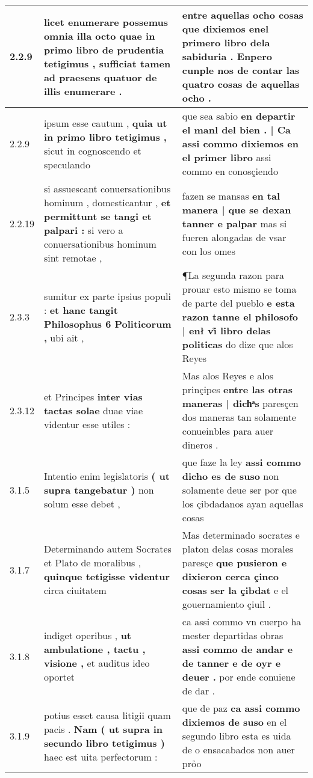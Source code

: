 \begin{tabular}{|p{1cm}|p{6.5cm}|p{6.5cm}|}
2.2.9 & licet enumerare possemus omnia illa octo \textbf{ quae in primo libro de prudentia tetigimus , } sufficiat tamen ad praesens quatuor de illis enumerare . & entre aquellas ocho cosas \textbf{ que dixiemos enel primero libro dela sabiduria . } Enpero cunple nos de contar las quatro cosas de aquellas ocho . \\\hline
2.2.9 & ipsum esse cautum , \textbf{ quia ut in primo libro tetigimus , } sicut in cognoscendo et speculando & que sea sabio \textbf{ en departir el manl del bien . | Ca assi commo dixiemos en el primer libro } assi commo en conosçiendo \\\hline
2.2.19 & si assuescant conuersationibus hominum , domesticantur , \textbf{ et permittunt se tangi et palpari : } si vero a conuersationibus hominum sint remotae , & fazen se mansas \textbf{ en tal manera | que se dexan tanner e palpar } mas si fueren alongadas de vsar con los omes \\\hline
2.3.3 & sumitur ex parte ipsius populi : \textbf{ et hanc tangit Philosophus 6 Politicorum , } ubi ait , & ¶La segunda razon para prouar esto mismo se toma de parte del pueblo \textbf{ e esta razon tanne el philosofo | enł vi̊ libro delas politicas } do dize que alos Reyes \\\hline
2.3.12 & et Principes \textbf{ inter vias tactas solae } duae viae videntur esse utiles : & Mas alos Reyes e alos prinçipes \textbf{ entre las otras maneras | dichͣs } paresçen dos maneras tan solamente conueinbles para auer dineros . \\\hline
3.1.5 & Intentio enim legislatoris \textbf{ ( ut supra tangebatur ) } non solum esse debet , & que faze la ley \textbf{ assi commo dicho es de suso } non solamente deue ser por que los çibdadanos ayan aquellas cosas \\\hline
3.1.7 & Determinando autem Socrates et Plato de moralibus , \textbf{ quinque tetigisse videntur } circa ciuitatem & Mas determinado socrates e platon delas cosas morales paresçe \textbf{ que pusieron e dixieron cerca çinco cosas ser la çibdat } e el gouernamiento çiuil . \\\hline
3.1.8 & indiget operibus , \textbf{ ut ambulatione , tactu , visione , } et auditus ideo oportet & ca assi commo vn cuerpo ha mester departidas obras \textbf{ assi commo de andar e de tanner e de oyr e deuer . } por ende conuiene de dar . \\\hline
3.1.9 & potius esset causa litigii quam pacis . \textbf{ Nam ( ut supra in secundo libro tetigimus ) } haec est uita perfectorum : & que de paz \textbf{ ca assi commo dixiemos de suso } en el segundo libro esta es uida de o ensacabados non auer prỏo \\\hline

\end{tabular}
